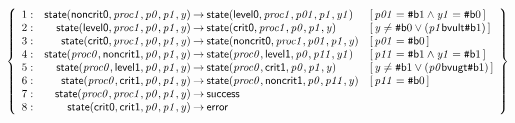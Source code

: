\documentclass[a4paper]{article}
\def\lthtmlcheckvsize{\ifdim\ht\sizebox<\vsize 
  \ifdim\wd\sizebox<\hsize\expandafter\hfill\fi \expandafter\vfill
  \else\expandafter\vss\fi}%
\begin{document}
{\newpage\clearpage
{}%
$\displaystyle \left\{
\begin{array}{rr@{\>}c@{\>}ll}
\mathrm{1} : 
 & \mathsf{state}(\mathsf{noncrit0},\mathit{proc1},\mathit{p0},\mathit{p1},\mathit{y})
 & \to 
 & \mathsf{state}(\mathsf{level0},\mathit{proc1},\mathit{p01},\mathit{p1},\mathit{y1})
 & [\, \mathit{p01} = {\mbox{\tt\symbol{35}}\mathsf{b}{1}} \land \mathit{y1} = {\mbox{\tt\symbol{35}}\mathsf{b}{0}} \,]\\
\par
\mathrm{2} : 
 & \mathsf{state}(\mathsf{level0},\mathit{proc1},\mathit{p0},\mathit{p1},\mathit{y})
 & \to 
 & \mathsf{state}(\mathsf{crit0},\mathit{proc1},\mathit{p0},\mathit{p1},\mathit{y})
 & [\, \mathit{y} \ne {\mbox{\tt\symbol{35}}\mathsf{b}{0}} \lor (\mathit{p1} \mathsf{bvult} {\mbox{\tt\symbol{35}}\mathsf{b}{1}}) \,]\\
\par
\mathrm{3} : 
 & \mathsf{state}(\mathsf{crit0},\mathit{proc1},\mathit{p0},\mathit{p1},\mathit{y})
 & \to 
 & \mathsf{state}(\mathsf{noncrit0},\mathit{proc1},\mathit{p01},\mathit{p1},\mathit{y})
 & [\, \mathit{p01} = {\mbox{\tt\symbol{35}}\mathsf{b}{0}} \,]\\
\par
\mathrm{4} : 
 & \mathsf{state}(\mathit{proc0},\mathsf{noncrit1},\mathit{p0},\mathit{p1},\mathit{y})
 & \to 
 & \mathsf{state}(\mathit{proc0},\mathsf{level1},\mathit{p0},\mathit{p11},\mathit{y1})
 & [\, \mathit{p11} = {\mbox{\tt\symbol{35}}\mathsf{b}{1}} \land \mathit{y1} = {\mbox{\tt\symbol{35}}\mathsf{b}{1}} \,]\\
\par
\mathrm{5} : 
 & \mathsf{state}(\mathit{proc0},\mathsf{level1},\mathit{p0},\mathit{p1},\mathit{y})
 & \to 
 & \mathsf{state}(\mathit{proc0},\mathsf{crit1},\mathit{p0},\mathit{p1},\mathit{y})
 & [\, \mathit{y} \ne {\mbox{\tt\symbol{35}}\mathsf{b}{1}} \lor (\mathit{p0} \mathsf{bvugt} {\mbox{\tt\symbol{35}}\mathsf{b}{1}}) \,]\\
\par
\mathrm{6} : 
 & \mathsf{state}(\mathit{proc0},\mathsf{crit1},\mathit{p0},\mathit{p1},\mathit{y})
 & \to 
 & \mathsf{state}(\mathit{proc0},\mathsf{noncrit1},\mathit{p0},\mathit{p11},\mathit{y})
 & [\, \mathit{p11} = {\mbox{\tt\symbol{35}}\mathsf{b}{0}} \,]\\
\par
\mathrm{7} : 
 & \mathsf{state}(\mathit{proc0},\mathit{proc1},\mathit{p0},\mathit{p1},\mathit{y})
 & \to 
 & \mathsf{success}\\
\par
\mathrm{8} : 
 & \mathsf{state}(\mathsf{crit0},\mathsf{crit1},\mathit{p0},\mathit{p1},\mathit{y})
 & \to 
 & \mathsf{error}\\
\par
\end{array}
\right\}
$%
\lthtmlindisplaymathZ
\lthtmlcheckvsize\clearpage}
\end{document}
